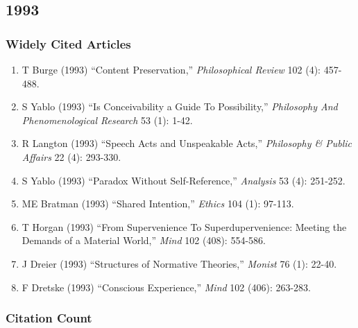 \documentclass[
  10pt,
  letterpaper,
  DIV=11,
  numbers=noendperiod,
  twoside]{scrartcl}
\providecommand{\tightlist}{%
  \setlength{\itemsep}{0pt}\setlength{\parskip}{0pt}}\usepackage{longtable,booktabs,array}
\begin{document}
\newpage

\subsection{1993}\label{sec-s1993}

\subsubsection*{Widely Cited Articles}\label{widely-cited-articles-37}

\begin{enumerate}
\def\labelenumi{\arabic{enumi}.}
\tightlist
\item
  T Burge (1993) ``Content Preservation,'' \emph{Philosophical Review}
  102 (4): 457-488.
\item
  S Yablo (1993) ``Is Conceivability a Guide To Possibility,''
  \emph{Philosophy And Phenomenological Research} 53 (1): 1-42.
\item
  R Langton (1993) ``Speech Acts and Unspeakable Acts,''
  \emph{Philosophy \& Public Affairs} 22 (4): 293-330.
\item
  S Yablo (1993) ``Paradox Without Self-Reference,'' \emph{Analysis} 53
  (4): 251-252.
\item
  ME Bratman (1993) ``Shared Intention,'' \emph{Ethics} 104 (1): 97-113.
\item
  T Horgan (1993) ``From Supervenience To Superdupervenience: Meeting
  the Demands of a Material World,'' \emph{Mind} 102 (408): 554-586.
\item
  J Dreier (1993) ``Structures of Normative Theories,'' \emph{Monist} 76
  (1): 22-40.
\item
  F Dretske (1993) ``Conscious Experience,'' \emph{Mind} 102 (406):
  263-283.
\end{enumerate}

\subsubsection*{Citation Count}\label{sec-count-1993}
\end{document}
